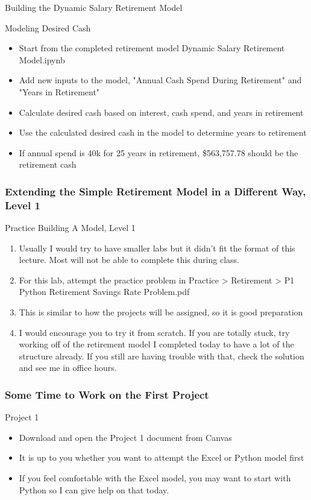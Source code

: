 \documentclass[handout, 11pt]{beamer}
\begin{document}
\begin{section}{Building the Dynamic Salary Retirement Model}
\begin{frame}
\begin{itemize}
\end{itemize}
\vfill
{
\begin{block}{Modeling Desired Cash}
\begin{itemize}
\item Start from the completed retirement model Dynamic Salary Retirement Model.ipynb 
\item Add new inputs to the model, "Annual Cash Spend During Retirement" and "Years in Retirement"
\item Calculate desired cash based on interest, cash spend, and years in retirement
\item Use the calculated desired cash in the model to determine years to retirement
\item If annual spend is 40k for 25 years in retirement, \$563,757.78 should be the retirement cash
\end{itemize}
\vfill
\end{block}
}
\end{frame}
\begin{frame}
\frametitle{Extending the Simple Retirement Model in a Different Way, Level 1}
{
\begin{block}{Practice Building A Model, Level 1}
\begin{enumerate}
\item Usually I would try to have smaller labs but it didn't fit the format of this lecture. Most will not be able to complete this during class.
\item For this lab, attempt the practice problem in Practice > Retirement > P1 Python Retirement Savings Rate Problem.pdf
\item This is similar to how the projects will be assigned, so it is good preparation
\item I would encourage you to try it from scratch. If you are totally stuck, try working off of the retirement model I completed today to have a lot of the structure already. If you still are having trouble with that, check the solution and see me in office hours.
\end{enumerate}
\vfill
\end{block}
}
\label{lab:retire-model-1}
\end{frame}
\begin{frame}
\frametitle{Some Time to Work on the First Project}
{
\begin{block}{Project 1}
\begin{itemize}
\item Download and open the Project 1 document from Canvas
\item It is up to you whether you want to attempt the Excel or Python model first
\item If you feel comfortable with the Excel model, you may want to start with Python so I can give help on that today.
\end{itemize}
\vfill
\end{block}
}
\end{frame}
\end{section}
\end{document}
